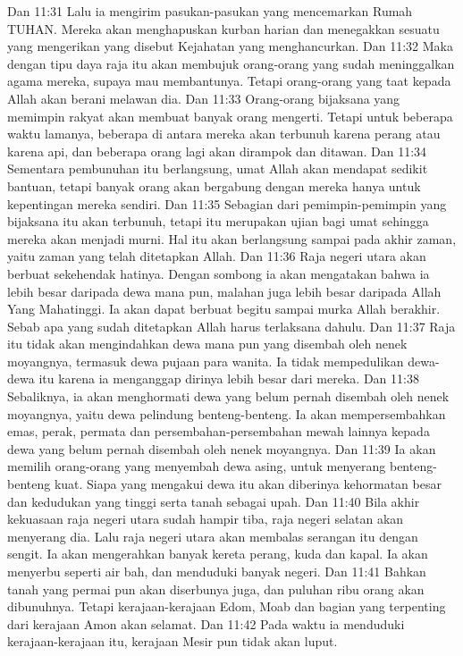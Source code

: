 Dan 11:31  Lalu ia mengirim pasukan-pasukan yang mencemarkan Rumah TUHAN. Mereka akan menghapuskan kurban harian dan menegakkan sesuatu yang mengerikan yang disebut Kejahatan yang menghancurkan.
Dan 11:32  Maka dengan tipu daya raja itu akan membujuk orang-orang yang sudah meninggalkan agama mereka, supaya mau membantunya. Tetapi orang-orang yang taat kepada Allah akan berani melawan dia.
Dan 11:33  Orang-orang bijaksana yang memimpin rakyat akan membuat banyak orang mengerti. Tetapi untuk beberapa waktu lamanya, beberapa di antara mereka akan terbunuh karena perang atau karena api, dan beberapa orang lagi akan dirampok dan ditawan.
Dan 11:34  Sementara pembunuhan itu berlangsung, umat Allah akan mendapat sedikit bantuan, tetapi banyak orang akan bergabung dengan mereka hanya untuk kepentingan mereka sendiri.
Dan 11:35  Sebagian dari pemimpin-pemimpin yang bijaksana itu akan terbunuh, tetapi itu merupakan ujian bagi umat sehingga mereka akan menjadi murni. Hal itu akan berlangsung sampai pada akhir zaman, yaitu zaman yang telah ditetapkan Allah.
Dan 11:36  Raja negeri utara akan berbuat sekehendak hatinya. Dengan sombong ia akan mengatakan bahwa ia lebih besar daripada dewa mana pun, malahan juga lebih besar daripada Allah Yang Mahatinggi. Ia akan dapat berbuat begitu sampai murka Allah berakhir. Sebab apa yang sudah ditetapkan Allah harus terlaksana dahulu.
Dan 11:37  Raja itu tidak akan mengindahkan dewa mana pun yang disembah oleh nenek moyangnya, termasuk dewa pujaan para wanita. Ia tidak mempedulikan dewa-dewa itu karena ia menganggap dirinya lebih besar dari mereka.
Dan 11:38  Sebaliknya, ia akan menghormati dewa yang belum pernah disembah oleh nenek moyangnya, yaitu dewa pelindung benteng-benteng. Ia akan mempersembahkan emas, perak, permata dan persembahan-persembahan mewah lainnya kepada dewa yang belum pernah disembah oleh nenek moyangnya.
Dan 11:39  Ia akan memilih orang-orang yang menyembah dewa asing, untuk menyerang benteng-benteng kuat. Siapa yang mengakui dewa itu akan diberinya kehormatan besar dan kedudukan yang tinggi serta tanah sebagai upah.
Dan 11:40  Bila akhir kekuasaan raja negeri utara sudah hampir tiba, raja negeri selatan akan menyerang dia. Lalu raja negeri utara akan membalas serangan itu dengan sengit. Ia akan mengerahkan banyak kereta perang, kuda dan kapal. Ia akan menyerbu seperti air bah, dan menduduki banyak negeri.
Dan 11:41  Bahkan tanah yang permai pun akan diserbunya juga, dan puluhan ribu orang akan dibunuhnya. Tetapi kerajaan-kerajaan Edom, Moab dan bagian yang terpenting dari kerajaan Amon akan selamat.
Dan 11:42  Pada waktu ia menduduki kerajaan-kerajaan itu, kerajaan Mesir pun tidak akan luput.

